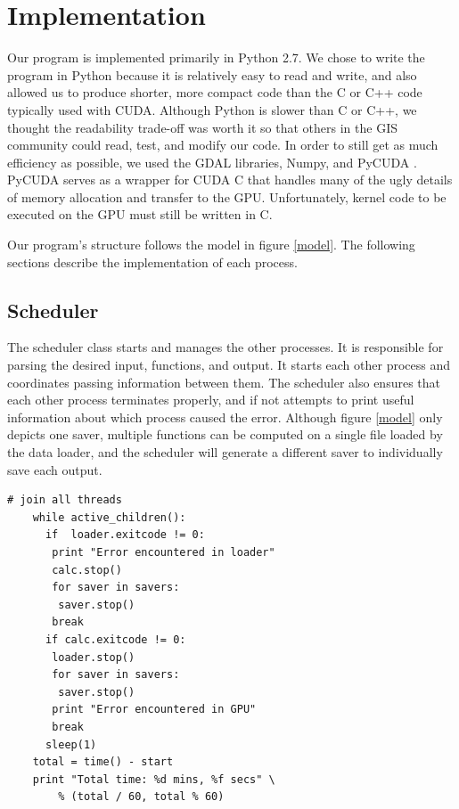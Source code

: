 \documentclass[journal]{IEEEtran}
\begin{document}
\section{Implementation} \label{implementation}
    Our program is implemented primarily in Python 2.7. We chose to write the
    program in Python because it is relatively easy to read and write, and also
    allowed us to produce shorter, more compact code than the C or C++ code
    typically used with CUDA.  Although Python is slower than C or C++, we
    thought the readability trade-off was worth it so that others in the GIS
    community could read, test, and modify our code. In order to still get as
    much efficiency as possible, we used the GDAL libraries, Numpy, and PyCUDA
    \cite{pycuda_1} \cite{pycuda_2}. PyCUDA serves as a wrapper for CUDA C that
    handles many of the ugly details of memory allocation and transfer to the
    GPU. Unfortunately, kernel code to be executed on the GPU must still be
    written in C. 
    
    Our program's structure follows the model in figure \ref{model}. The
    following sections describe the implementation of each process.

    \subsection{Scheduler}
    The scheduler class starts and manages the other processes. It is
    responsible for parsing the desired input, functions, and output. It starts
    each other process and coordinates passing information between them. The
    scheduler also ensures that each other process terminates properly, and if
    not attempts to print useful information about which process caused the
    error. Although figure \ref{model} only depicts one saver, multiple
    functions can be computed on a single file loaded by the data loader, and
    the scheduler will generate a different saver to individually save each
    output.
    
    \begin{Verbatim}[frame=single, gobble=4]
    # join all threads
    while active_children():
      if  loader.exitcode != 0:
       print "Error encountered in loader"            
       calc.stop()
       for saver in savers:
        saver.stop()
       break
      if calc.exitcode != 0:
       loader.stop()
       for saver in savers:
        saver.stop()
       print "Error encountered in GPU"
       break
      sleep(1)    
    total = time() - start
    print "Total time: %d mins, %f secs" \
        % (total / 60, total % 60)
    \end{Verbatim}
    \break
\end{document}
